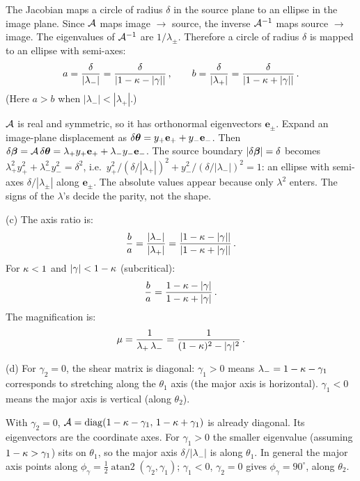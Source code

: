 The Jacobian maps a circle of radius $\delta$ in the source plane to
an ellipse in the image plane.  Since $\mathcal{A}$ maps image $\to$ source,
the inverse $\mathcal{A}^{-1}$ maps source $\to$ image.  The
eigenvalues of $\mathcal{A}^{-1}$ are $1/\lambda_\pm$.  Therefore a circle
of radius $\delta$ is mapped to an ellipse with semi-axes:
\begin{equation*}
    a = \frac{\delta}{|\lambda_-|}
    = \frac{\delta}{|1 - \kappa - |\gamma||} \,, \qquad
    b = \frac{\delta}{|\lambda_+|}
    = \frac{\delta}{|1 - \kappa + |\gamma||} \,.
\end{equation*}
(Here $a > b$ when $|\lambda_-| < |\lambda_+|$.)
\begin{derivation}
$\mathcal{A}$ is real and symmetric, so it has orthonormal eigenvectors
$\mathbf{e}_\pm$. Expand an image-plane displacement as
$\delta\boldsymbol{\theta} = y_+\mathbf{e}_+ + y_-\mathbf{e}_-$. Then
$\delta\boldsymbol{\beta} = \mathcal{A}\,\delta\boldsymbol{\theta} = \lambda_+y_+\mathbf{e}_+ + \lambda_-y_-\mathbf{e}_-$.
The source boundary $|\delta\boldsymbol{\beta}| = \delta$ becomes
$\lambda_+^2y_+^2 + \lambda_-^2y_-^2 = \delta^2$, i.e.\
$y_+^2/(\delta/|\lambda_+|)^2 + y_-^2/(\delta/|\lambda_-|)^2 = 1$: an ellipse
with semi-axes $\delta/|\lambda_\pm|$ along $\mathbf{e}_\pm$. The
absolute values appear because only $\lambda^2$ enters. The signs of the
$\lambda$'s decide the parity, not the shape.
\end{derivation}

(c) The axis ratio is:
\begin{equation*}
    \frac{b}{a} = \frac{|\lambda_-|}{|\lambda_+|}
    = \frac{|1 - \kappa - |\gamma||}{|1 - \kappa + |\gamma||} \,.
\end{equation*}
For $\kappa < 1$ and $|\gamma| < 1 - \kappa$ (subcritical):
\begin{equation*}
    \frac{b}{a} = \frac{1 - \kappa - |\gamma|}{1 - \kappa + |\gamma|} \,.
\end{equation*}
The magnification is:
\begin{equation*}
    \mu = \frac{1}{\lambda_+\,\lambda_-}
    = \frac{1}{(1-\kappa)^2 - |\gamma|^2} \,.
\end{equation*}

(d) For $\gamma_2 = 0$, the shear matrix is diagonal:
$\gamma_1 > 0$ means $\lambda_- = 1 - \kappa - \gamma_1$ corresponds
to stretching along the $\theta_1$ axis (the major axis is horizontal).
$\gamma_1 < 0$ means the major axis is vertical (along $\theta_2$).
\begin{derivation}
With $\gamma_2 = 0$, $\mathcal{A} = \operatorname{diag}(1 - \kappa - \gamma_1,\, 1 - \kappa + \gamma_1)$
is already diagonal. Its eigenvectors are the coordinate axes. For
$\gamma_1 > 0$ the smaller eigenvalue (assuming $1 - \kappa > \gamma_1$) sits
on $\theta_1$, so the major axis $\delta/|\lambda_-|$ is along $\theta_1$. In
general the major axis points along $\phi_\gamma = \tfrac12\operatorname{atan2}(\gamma_2, \gamma_1)$;
$\gamma_1 < 0$, $\gamma_2 = 0$ gives $\phi_\gamma = 90^\circ$, along $\theta_2$.
\end{derivation}

